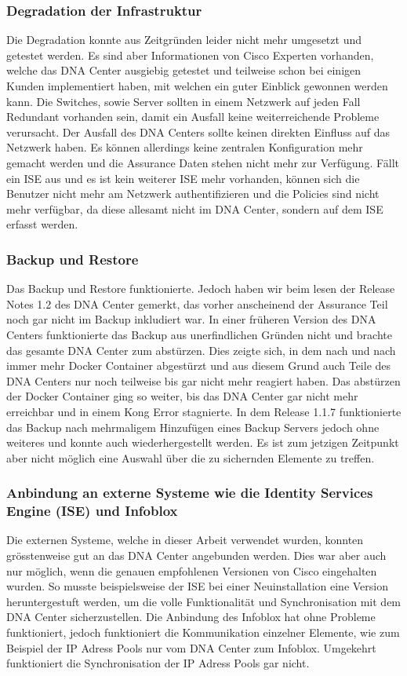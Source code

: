 \subsubsection{Degradation der Infrastruktur}
Die Degradation konnte aus Zeitgründen leider nicht mehr umgesetzt und getestet werden. Es sind aber Informationen von Cisco Experten vorhanden, welche das DNA Center ausgiebig getestet und teilweise schon bei einigen Kunden implementiert haben, mit welchen ein guter Einblick gewonnen werden kann. Die Switches, sowie Server sollten in einem Netzwerk auf jeden Fall Redundant vorhanden sein, damit ein Ausfall keine weiterreichende Probleme verursacht. Der Ausfall des DNA Centers sollte keinen direkten Einfluss auf das Netzwerk haben. Es können allerdings keine zentralen Konfiguration mehr gemacht werden und die Assurance Daten stehen nicht mehr zur Verfügung. Fällt ein ISE aus und es ist kein weiterer ISE mehr vorhanden, können sich die Benutzer nicht mehr am Netzwerk authentifizieren und die Policies sind nicht mehr verfügbar, da diese allesamt nicht im DNA Center, sondern auf dem ISE erfasst werden.

\subsubsection{Backup und Restore}
Das Backup und Restore funktionierte. Jedoch haben wir beim lesen der Release Notes 1.2 des DNA Center gemerkt, das vorher anscheinend der Assurance Teil noch gar nicht im Backup inkludiert war. In einer früheren Version des DNA Centers funktionierte das Backup aus unerfindlichen Gründen nicht und brachte das gesamte DNA Center zum abstürzen. Dies zeigte sich, in dem nach und nach immer mehr Docker Container abgestürzt und aus diesem Grund auch Teile des DNA Centers nur noch teilweise bis gar nicht mehr reagiert haben. Das abstürzen der Docker Container ging so weiter, bis das DNA Center gar nicht mehr erreichbar und in einem Kong Error stagnierte. In dem Release 1.1.7 funktionierte das Backup nach mehrmaligem Hinzufügen eines Backup Servers jedoch ohne weiteres und konnte auch wiederhergestellt werden. Es ist zum jetzigen Zeitpunkt aber nicht möglich eine Auswahl über die zu sichernden Elemente zu treffen.

\subsubsection{Anbindung an externe Systeme wie die Identity Services Engine (ISE) und Infoblox}
Die externen Systeme, welche in dieser Arbeit verwendet wurden, konnten grösstenweise gut an das DNA Center angebunden werden. Dies war aber auch nur möglich, wenn die genauen empfohlenen Versionen von Cisco eingehalten wurden. So musste beispielsweise der ISE bei einer Neuinstallation eine Version heruntergestuft werden, um die volle Funktionalität und Synchronisation mit dem DNA Center sicherzustellen. Die Anbindung des Infoblox hat ohne Probleme funktioniert, jedoch funktioniert die Kommunikation einzelner Elemente, wie zum Beispiel der IP Adress Pools nur vom DNA Center zum Infoblox. Umgekehrt funktioniert die Synchronisation der IP Adress Pools gar nicht. 

